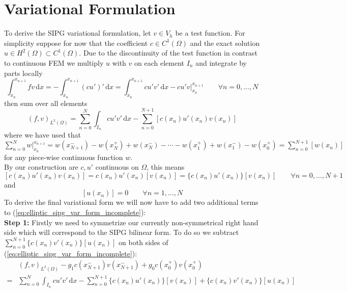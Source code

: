 \section{Variational Formulation}
To derive the SIPG variational formulation, let $v \in V_h$ be a test
function. For simplicity suppose for now that the coefficient $c \in C^1(\Omega)$ and
the exact solution $u \in H^2(\Omega) \subset C^1(\Omega)$. 
Due to the discontinuity of the test function in contrast to 
continuous FEM we multiply $u$ with $v$ on each element $I_n$
and integrate by parts locally
\begin{equation*}
    \int_{x_n}^{x_{n+1}} fv\, \text{d}x = -\int_{x_n}^{x_{n+1}} (cu')'\, \text{d}x 
    = \int_{x_n}^{x_{n+1}} cu'v'\, \text{d}x 
    -  cu'v\Big|_{x_n}^{x_{n+1}} \qquad \forall n=0,\ldots,N
\end{equation*}
then sum over all elements
\begin{equation}
    \label{eq:elliptic_sipg_var_form_incomplete}
    (f,v)_{L^2(\Omega)} = \sum_{n=0}^N \int_{I_n} cu'v'\, \text{d}x 
    -\sum_{n=0}^{N+1} [c(x_n)u'(x_n)v(x_n)]
\end{equation}
where we have used that $\sum_{n=0}^N  w \Big|_{x_n}^{x_{n+1}} = w(x_{N+1}^-) - 
w(x_{N}^+) + w(x_{N}^-) - \cdots - w(x_1^+) + w(x_1^-) - w(x_0^+) = \sum_{n=0}^{N+1} [w(x_n)]$ for any piece-wise continuous function $w$.
\\
By our construction are $c, u'$ continuous on $\Omega$, this means 
\begin{equation}
    \label{eq:id_1_cu_jump_zero}
        [c(x_n)u'(x_n)v(x_n)] = c(x_n)u'(x_n)[v(x_n)] = \{c(x_n)u'(x_n)\}[v(x_n)] \qquad \forall n=0,\ldots,N+1
\end{equation}
and 
\begin{equation}
    \label{eq:id_2_u_jump_zero}
    [u(x_n)] = 0 \qquad \forall n=1,\ldots,N
\end{equation}
To derive the final variational form we will now have to add two additional terms
to (\ref{eq:elliptic_sipg_var_form_incomplete}): \\
\textbf{Step 1:} Firstly we need to symmetrize our currently non-symmetrical right hand side
which will correspond to the SIPG bilinear form. To do so
we subtract $\sum_{n=0}^{N+1} \{c(x_n)v'(x_n)\}[u(x_n)]$ on both sides of
(\ref{eq:elliptic_sipg_var_form_incomplete}):
\begin{align*}
    &(f,v)_{L^2(\Omega)}-g_1c(x_{N+1}^-)v(x_{N+1}^-) + g_0c(x_0^+)v(x_0^+) \\
    = &\sum_{n=0}^N \int_{I_n} cu'v'\, \text{d}x 
    -\sum_{n=0}^{N+1} \{c(x_n)u'(x_n)\}[v(x_n)] + \{c(x_n)v'(x_n)\}[u(x_n)]
\end{align*}
